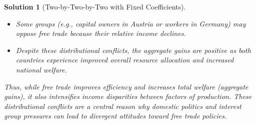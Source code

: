 \documentclass[a4paper,12pt]{article} %
\theoremstyle{nonitalic}
\newtheorem{solution}{Solution}
\begin{document}
\begin{solution}[Two-by-Two-by-Two with Fixed Coefficients]
\begin{enumerate}
\begin{enumerate}
\begin{itemize}
\begin{itemize}
                                \item Some groups (e.g., capital owners in Austria or workers in Germany) may oppose free trade because their relative income declines.
                                \item Despite these distributional conflicts, the aggregate gains are positive as both countries experience improved overall resource allocation and increased national welfare.
                            \end{itemize}
                    \end{itemize}
                    Thus, while free trade improves efficiency and increases total welfare (aggregate gains), it also intensifies income disparities between factors of production. These distributional conflicts are a central reason why domestic politics and interest group pressures can lead to divergent attitudes toward free trade policies.
                \end{enumerate}
    \end{enumerate}
\end{solution}
\end{document}
